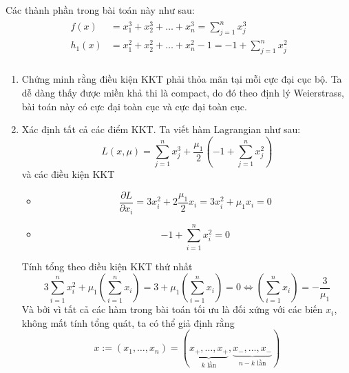 \begin{solution}

    Các thành phần trong bài toán này như sau:
    \begin{align}
        \begin{aligned}
            f(x) &= x_1^3 + x_2^3 + \dots + x_n^3 = \sum_{j=1}^nx_j^3\\
            h_1(x) &= x_1^2 + x_2^2 + \dots + x_n^2 - 1 = -1 + \sum_{j=1}^nx_j^2  \\
        \end{aligned}
    \end{align}
    \begin{enumerate}[label=(\alph*)]
        \item Chứng minh rằng điều kiện KKT phải thỏa mãn tại mỗi cực đại cục bộ. Ta dễ dàng thấy được miền khả thi là compact, do đó theo định lý Weierstrass, bài toán này có cực đại toàn cục và cực đại toàn cục. 
        \item Xác định tất cả các điểm KKT. Ta viết hàm Lagrangian như sau:
        \begin{equation}
            L(x, \mu) = \sum_{j=1}^nx_j^3 + \dfrac{\mu_1}{2}\left(-1 + \sum_{j=1}^nx_j^2\right)
        \end{equation}
        và các điều kiện KKT
        \begin{itemize}
            \item \begin{equation}
                \dfrac{\partial L}{\partial x_i} = 3x_i^2 + 2\dfrac{\mu_1}{2} x_i = 3x_i^2 + \mu_1x_i = 0
            \end{equation}
            \item \begin{equation}
                -1 + \sum_{i=1}^nx_i^2 = 0
            \end{equation}
        \end{itemize}
        Tính tổng theo điều kiện KKT thứ nhất
        \begin{equation}
            3\sum_{i=1}^nx_i^2 + \mu_1\left(\sum_{i=1}^nx_i\right) = 3 + \mu_1\left(\sum_{i=1}^nx_i\right) = 0 \Leftrightarrow \left(\sum_{i=1}^nx_i\right) = -\dfrac{3}{\mu_1}
        \end{equation}
        Và bởi vì tất cả các hàm trong bài toán tối ưu là đối xứng với các biến $x_i$, không mất tính tổng quát, ta có thể giả định rằng 
        \begin{equation}
            x := (x_1, \dots, x_n) = (\underset{k\text{ lần}}{\underbrace{x_{+}, \dots, x_{+}}},\underset{n-k\text{ lần}}{\underbrace{x_{-}, \dots, x_{-}}})

\end{equation}
\end{enumerate}
\end{solution}
